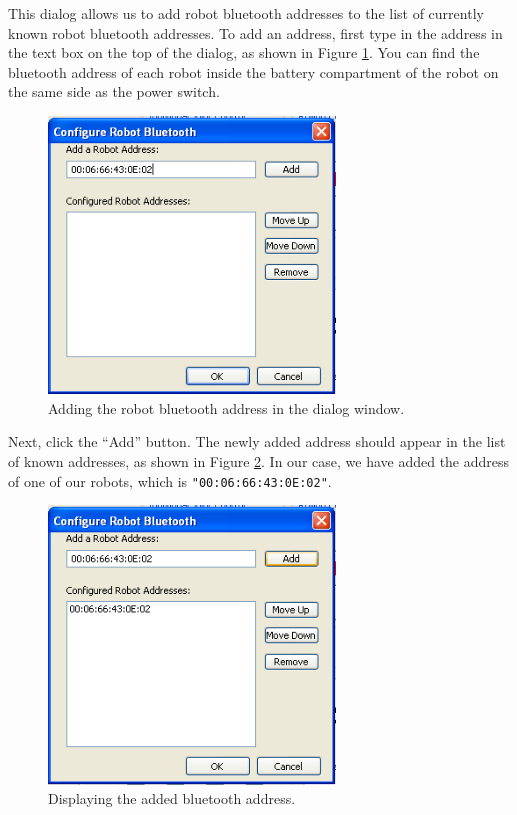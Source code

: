 \documentclass{article}
\begin{document}
This dialog allows us to add robot bluetooth addresses to the list of currently
known robot bluetooth addresses. To add an address, first type in the address
in the text box on the top of the dialog, as shown in Figure \ref{fig:shot5.png}.
You can find the bluetooth address of each robot inside the battery compartment
of the robot on the same side as the power switch. 

\begin{figure}[H]
\begin{center}
\includegraphics[width=3in]{images/shot5.png}
\end{center}
\caption{\label{fig:shot5.png} Adding the robot bluetooth address in the dialog window.}
\end{figure}

Next, click the ``Add'' button. The newly added address should appear in the 
list of known addresses, as shown in Figure \ref{fig:shot6.png}. In our case, we have added the 
address of one of our robots, which is \texttt{"00:06:66:43:0E:02"}.

\begin{figure}[H]
\begin{center}
\includegraphics[width=3in]{images/shot6.png}
\end{center}
\caption{\label{fig:shot6.png} Displaying the added bluetooth address.}
\end{figure}
\end{document}
